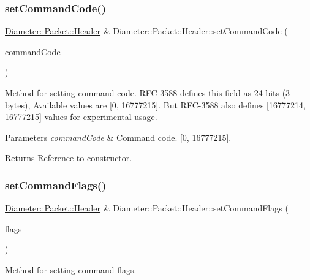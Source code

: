 \subsubsection{\texorpdfstring{set\+Command\+Code()}{setCommandCode()}}
{\footnotesize\ttfamily \hyperlink{classDiameter_1_1Packet_1_1Header}{Diameter\+::\+Packet\+::\+Header} \& Diameter\+::\+Packet\+::\+Header\+::set\+Command\+Code (\begin{DoxyParamCaption}\item[{Command\+Code\+Type}]{command\+Code }\end{DoxyParamCaption})}



Method for setting command code. R\+F\+C-\/3588 defines this field as 24 bits (3 bytes), Available values are \mbox{[}0, 16777215\mbox{]}. But R\+F\+C-\/3588 also defines \mbox{[}16777214, 16777215\mbox{]} values for experimental usage. 


\begin{DoxyParams}{Parameters}
{\em command\+Code} & Command code. \mbox{[}0, 16777215\mbox{]}. \\
\hline
\end{DoxyParams}
\begin{DoxyReturn}{Returns}
Reference to constructor. 
\end{DoxyReturn}
\mbox{\label{classDiameter_1_1Packet_1_1Header_aaf3efbe6f1b797d64ae79f9f9f6637f4}} 
\subsubsection{\texorpdfstring{set\+Command\+Flags()}{setCommandFlags()}}
{\footnotesize\ttfamily \hyperlink{classDiameter_1_1Packet_1_1Header}{Diameter\+::\+Packet\+::\+Header} \& Diameter\+::\+Packet\+::\+Header\+::set\+Command\+Flags (\begin{DoxyParamCaption}\item[{\hyperlink{classDiameter_1_1Packet_1_1Header_1_1Flags}{Flags}}]{flags }\end{DoxyParamCaption})}



Method for setting command flags. 


